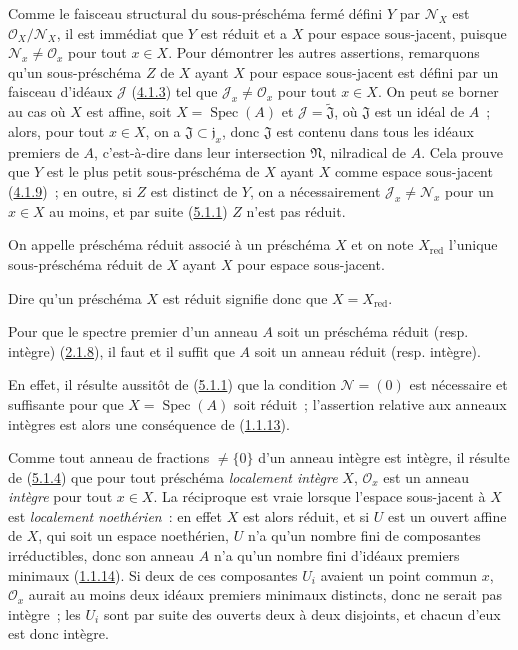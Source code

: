 Comme le faisceau structural du sous-préschéma fermé défini $Y$ par
$\mathscr{N}_X$ est $\mathscr{O}_X/\mathscr{N}_X$, il est immédiat que $Y$
est réduit et a $X$ pour espace sous-jacent, puisque
$\mathscr{N}_x\ne\mathscr{O}_x$ pour tout $x\in X$. Pour démontrer les autres
assertions, remarquons qu'un sous-préschéma $Z$ de $X$ ayant $X$ pour espace
sous-jacent est défini par un faisceau d'idéaux $\mathscr{J}$
(\hyperref[I.4.1.3-fr]{4.1.3}) tel que
$\mathscr{J}_x\ne\mathscr{O}_x$ pour tout $x\in X$. On peut se borner au cas
où $X$ est affine, soit $X=\operatorname{Spec}(A)$ et
$\mathscr{J}=\widetilde{\mathfrak{J}}$, où $\mathfrak{J}$ est un idéal de
$A$~; alors, pour tout $x\in X$, on a
$\mathfrak{J}\subset\mathfrak{j}_x$, donc $\mathfrak{J}$ est contenu dans
tous les idéaux premiers de $A$, c'est-à-dire dans leur intersection
$\mathfrak{N}$, nilradical de $A$. Cela prouve que $Y$ est le plus petit
sous-préschéma de $X$ ayant $X$ comme espace sous-jacent
(\hyperref[I.4.1.9-fr]{4.1.9})~; en outre, si $Z$ est distinct de $Y$, on a
nécessairement $\mathscr{J}_x\ne\mathscr{N}_x$ pour un $x\in X$ au moins, et
par suite (\hyperref[I.5.1.1-fr]{5.1.1}) $Z$ n'est pas réduit.

\begin{definition}[5.1.3]
\label{I.5.1.3-fr}
On appelle préschéma réduit associé à un préschéma $X$ et on note
$X_{\mathrm{red}}$ l'unique sous-préschéma réduit de $X$ ayant $X$ pour
espace sous-jacent.
\end{definition}

Dire qu'un préschéma $X$ est réduit signifie donc que
$X=X_{\mathrm{red}}$.

\begin{proposition}[5.1.4]
\label{I.5.1.4-fr}
Pour que le spectre premier d'un anneau $A$ soit un préschéma réduit (resp.
intègre) (\hyperref[I.2.1.8-fr]{2.1.8}), il faut et il suffit que $A$ soit un
anneau réduit (resp. intègre).
\end{proposition}

En effet, il résulte aussitôt de (\hyperref[I.5.1.1-fr]{5.1.1}) que la
condition $\mathscr{N}=(0)$ est nécessaire et suffisante pour que
$X=\operatorname{Spec}(A)$ soit réduit~; l'assertion relative aux anneaux
intègres est alors une conséquence de
(\hyperref[I.1.1.13-fr]{1.1.13}).

Comme tout anneau de fractions $\ne\{0\}$ d'un anneau intègre est intègre, il
résulte de (\hyperref[I.5.1.4-fr]{5.1.4}) que pour tout préschéma
\emph{localement intègre} $X$, $\mathscr{O}_x$ est un anneau \emph{intègre}
pour tout $x\in X$. La réciproque est vraie lorsque l'espace sous-jacent à
$X$ est \emph{localement noethérien}~: en effet $X$ est alors réduit, et si
$U$ est un ouvert affine de $X$, qui soit un espace noethérien, $U$ n'a qu'un
nombre fini de composantes irréductibles, donc son anneau $A$ n'a qu'un
nombre fini d'idéaux premiers minimaux
(\hyperref[I.1.1.14-fr]{1.1.14}). Si deux de ces composantes $U_i$ avaient un
point commun $x$, $\mathscr{O}_x$ aurait au moins deux idéaux premiers
minimaux distincts, donc ne serait pas intègre~; les $U_i$ sont par suite des
ouverts deux à deux disjoints, et chacun d'eux est donc intègre.

